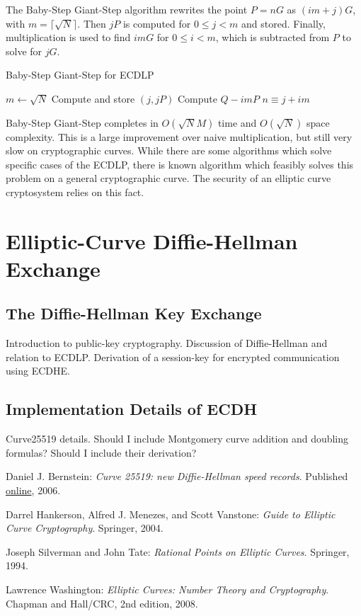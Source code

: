 \documentclass{article}
\begin{document}
The Baby-Step Giant-Step algorithm rewrites the point $P = nG$ as $(im + j)G$, with $m = \lceil \sqrt{N} \rceil$.
Then $jP$ is computed for $0 \leq j < m$ and stored.
Finally, multiplication is used to find $imG$ for $0 \leq i < m$, which is subtracted from $P$ to solve for $jG$.

\begin{algorithm}
\caption{Baby-Step Giant-Step for ECDLP}
\begin{algorithmic}
\State $m \gets \sqrt{N}$
	\State Compute and store $(j, jP)$
\EndFor
{}
	\State Compute $Q - imP$
		\State \Return $n \equiv j + im$
	\EndIf
\EndFor
\end{algorithmic}
\end{algorithm}

Baby-Step Giant-Step completes in $O(\sqrt{N} M)$ time and $O(\sqrt{N})$ space complexity.
This is a large improvement over naive multiplication, but still very slow on cryptographic curves. 
While there are some algorithms which solve specific cases of the ECDLP, there is known algorithm which feasibly solves this problem on a general cryptographic curve.
The security of an elliptic curve cryptosystem relies on this fact.

\clearpage

\section{Elliptic-Curve Diffie-Hellman Exchange}

\subsection{The Diffie-Hellman Key Exchange}
Introduction to public-key cryptography.
Discussion of Diffie-Hellman and relation to ECDLP.
Derivation of a session-key for encrypted communication using ECDHE.

\subsection{Implementation Details of ECDH}
Curve25519 details.
Should I include Montgomery curve addition and doubling formulas?
Should I include their derivation?

\clearpage

\begin{thebibliography}{9}

	Daniel J. Bernstein:
	\emph{Curve 25519: new Diffie-Hellman speed records}.
	Published \href{http://cr.yp.to/ecdh/curve25519-20060209.pdf}{online},
	2006.

	Darrel Hankerson, Alfred J. Menezes, and Scott Vanstone:
	\emph{Guide to Elliptic Curve Cryptography}.
	Springer,
	2004.

	Joseph Silverman and John Tate:
	\emph{Rational Points on Elliptic Curves}.
	Springer,
	1994.

	Lawrence Washington:
	\emph{Elliptic Curves: Number Theory and Cryptography}.
	Chapman and Hall/CRC,
	2nd edition,
	2008.

\end{thebibliography}
\end{document}
